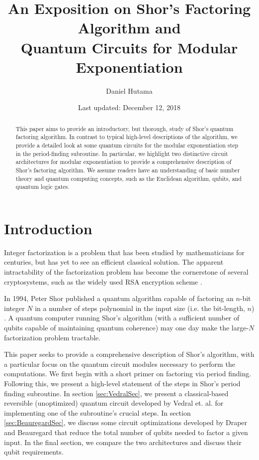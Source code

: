 \documentclass{article}
\title{\Large 
An Exposition on Shor’s Factoring Algorithm and \\
Quantum Circuits for Modular Exponentiation
}
\author{ Daniel Hutama
        }
\date{\small Last updated: December 12, 2018}
\begin{document}
\maketitle

\begin{abstract}

This paper aims to provide an introductory, but thorough, study of Shor's quantum factoring algorithm. In contrast to typical high-level descriptions of the algorithm, we provide a detailed look at some quantum circuits for the modular exponentiation step in the period-finding subroutine. In particular, we highlight two distinctive circuit architectures for modular exponentiation to provide a comprehensive description of Shor's factoring algorithm. We assume readers have an understanding of basic number theory and quantum computing concepts, such as the Euclidean algorithm, qubits, and quantum logic gates.

\end{abstract}

\section{Introduction}\label{sec:introduction}

Integer factorization is a problem that has been studied by mathematicians for centuries, but has yet to see an efficient classical solution. The apparent intractability of the factorization problem has become the cornerstone of several cryptosystems, such as the widely used RSA encryption scheme \cite{RSA78}. 

In 1994, Peter Shor published a quantum algorithm capable of factoring an $n$-bit integer $N$ in a number of steps polynomial in the input size (i.e. the bit-length, $n$) \cite{Sho94}. A quantum computer running Shor's algorithm (with a sufficient number of qubits capable of maintaining quantum coherence) may one day make the large-$N$ factorization problem tractable. 

This paper seeks to provide a comprehensive description of Shor's algorithm, with a particular focus on the quantum circuit modules necessary to perform the computations. We first begin with a short primer on factoring via period finding. Following this, we present a high-level statement of the steps in Shor's period finding subroutine. In section \ref{sec:VedralSec}, we present a  classical-based reversible (unoptimized) quantum circuit developed by Vedral et. al. for implementing one of the subroutine's crucial steps. In section \ref{sec:BeauregardSec}, we discuss some circuit optimizations developed by Draper and Beauregard that reduce the total number of qubits needed to factor a given input. In the final section, we compare the two architectures and discuss their qubit requirements.
\end{document}
